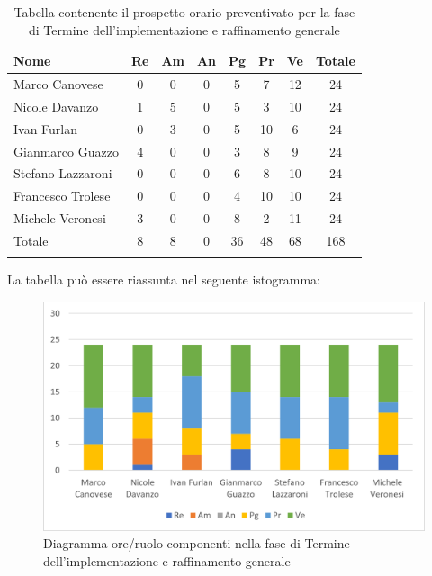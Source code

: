 \begin{longtable}{|l|c|c|c|c|c|c|c|}
	\hline
	\rowcolor{lighter-grayer}
	\textbf{Nome}     & \textbf{Re} & \textbf{Am} & \textbf{An} & \textbf{Pg} & \textbf{Pr} & \textbf{Ve} & \textbf{Totale} \\
	\hline
	\endfirsthead

	\hline
	Marco Canovese    & 0           & 0           & 0           & 5           & 7           & 12          & 24              \\
	\hline
	\hline
	Nicole Davanzo    & 1           & 5           & 0           & 5           & 3           & 10          & 24              \\
	\hline
	\hline
	Ivan Furlan       & 0           & 3           & 0           & 5           & 10          & 6           & 24              \\
	\hline
	\hline
	Gianmarco Guazzo  & 4           & 0           & 0           & 3           & 8           & 9           & 24              \\
	\hline
	\hline
	Stefano Lazzaroni & 0           & 0           & 0           & 6           & 8           & 10          & 24              \\
	\hline
	\hline
	Francesco Trolese & 0           & 0           & 0           & 4           & 10          & 10          & 24              \\
	\hline
	\hline
	Michele Veronesi  & 3           & 0           & 0           & 8           & 2           & 11          & 24              \\
	\hline
	\hline
	Totale            & 8           & 8           & 0           & 36          & 48          & 68          & 168             \\
	\hline
	\rowcolor{white}
	\caption{Tabella contenente il prospetto orario preventivato per la fase di Termine dell'implementazione e raffinamento generale}
\end{longtable}


La tabella può essere riassunta nel seguente istogramma:

\begin{figure}[H]
	\centering
	\includegraphics[width=0.8\linewidth]{res/images/preventivo/6-1.png}
	\caption{Diagramma ore/ruolo componenti nella fase di Termine dell'implementazione e raffinamento generale}
	\label{fig:diagramma suddivisione ruoli fase Termine dell'implementazione e raffinamento generale}
\end{figure}

